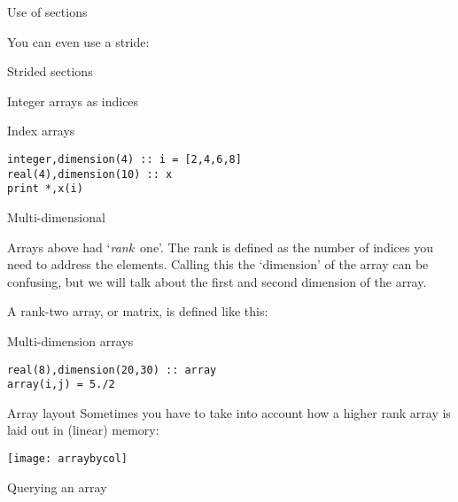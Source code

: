 \begin{block}{Use of sections}
  \label{sl:farray-sectionassign}
\end{block}

You can even use a stride:

\begin{block}{Strided sections}
  \label{sl:farray-strideassign}
\end{block}

 {Integer arrays as indices}

\begin{block}{Index arrays}
  \label{sl:farray-indexarray}
\begin{verbatim}
integer,dimension(4) :: i = [2,4,6,8]
real(4),dimension(10) :: x
print *,x(i)
\end{verbatim}
\end{block}

 {Multi-dimensional}

Arrays above had `\emph{rank}~one'. The rank is
defined as the number of indices you need to address the
elements. Calling this the `dimension' of the array can be confusing, but
we will talk about the first and second dimension of the array.

A rank-two array, or matrix, is defined like this:
\begin{block}{Multi-dimension arrays}
  \label{sl:farray-2d}
\begin{verbatim}
real(8),dimension(20,30) :: array
array(i,j) = 5./2
\end{verbatim}
\end{block}

\begin{block}{Array layout}
  \label{sl:farray-layout}
  Sometimes you have to take into account how a higher rank array
  is laid out in (linear) memory:

  \texttt{[image: arraybycol]}
\end{block}

 {Querying an array}

